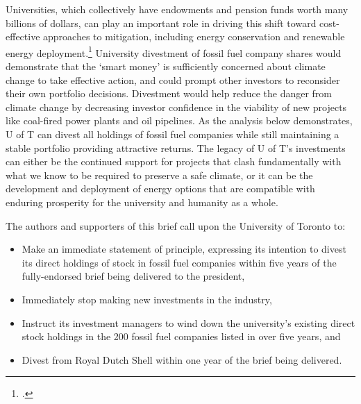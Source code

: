 Universities, which collectively have endowments and pension funds worth many billions of dollars, can play an important role in driving this shift toward cost-effective approaches to  mitigation, including energy conservation and renewable energy deployment.\footcite[The consultancy McKinsey \& Company has studied and ranked global options for mitigating GHG pollution, considering their cost, plausible deployment speed, and the scale at which they can help solve the problem. See: ][p. 8]{McKinseyCurve}
University divestment of fossil fuel company shares would demonstrate that the `smart money' is sufficiently concerned about climate change to take effective action, and could prompt other investors to reconsider their own portfolio decisions. 
Divestment would help reduce the danger from climate change by decreasing investor confidence in the viability of new projects like coal-fired power plants and oil pipelines.
As the analysis below demonstrates, U of T can divest all holdings of fossil fuel companies while still maintaining a stable portfolio providing attractive returns.
The legacy of U of T's investments can either be the continued support for projects that clash fundamentally with what we know to be required to preserve a safe climate, or it can be the development and deployment of energy options that are compatible with enduring prosperity for the university and humanity as a whole.



The authors and supporters of this brief call upon the University of Toronto to:
\begin{itemize}
	\item Make an immediate statement of principle, expressing its intention to divest its direct holdings of stock in fossil fuel companies within five years of the fully-endorsed brief being delivered to the president,
	\item Immediately stop making new investments in the industry,
	\item Instruct its investment managers to wind down the university's existing direct stock holdings in the 200 fossil fuel companies listed in  over five years, and
	\item Divest from Royal Dutch Shell within one year of the brief being delivered.
\end{itemize}



